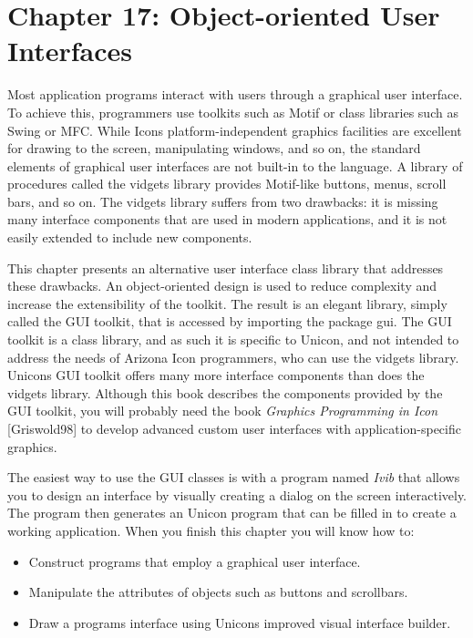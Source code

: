 \clearpage\section{Chapter 17: Object-oriented User Interfaces}

Most application programs interact with users through a graphical
user interface. To achieve this, programmers use
toolkits such as Motif or class libraries such as Swing or MFC. While
Icon{\textquotesingle}s platform-independent graphics facilities are
excellent for drawing to the screen, manipulating
windows, and so on, the standard elements of graphical user interfaces are not built-in to the language. A
library of procedures called the vidgets library provides Motif-like
buttons, menus, scroll bars, and so on. The vidgets library suffers
from two drawbacks: it is missing many interface components that are
used in modern applications, and it is not easily extended to include
new components.

This chapter presents an alternative user interface class library that
addresses these drawbacks. An object-oriented design is used to reduce
complexity and increase the extensibility of the toolkit. The result is
an elegant library, simply called {\textquotedbl}the GUI
toolkit,{\textquotedbl} that is accessed by importing the package gui.
The GUI toolkit is a class library, and as such it is specific to
Unicon, and not intended to address the needs of Arizona Icon
programmers, who can use the vidgets library. Unicon{\textquotesingle}s
GUI toolkit offers many more interface components than does the vidgets
library. Although this book describes the components provided by the
GUI toolkit, you will probably need the book \textit{Graphics
Programming in Icon} [Griswold98] to develop advanced custom user
interfaces with application-specific graphics.

The easiest way to use the GUI classes is with a program named
\textit{Ivib} that allows you to design an interface by visually
creating a dialog on the screen interactively. The program then
generates an Unicon program that can be filled in to create a working
application. When you finish this chapter you will know how to:

\begin{itemize}
\item Construct programs that employ a graphical user interface.
\item Manipulate the attributes of objects such as buttons and
scrollbars.
\item Draw a program{\textquotesingle}s interface using
Unicon{\textquotesingle}s improved visual interface builder.
\end{itemize}
